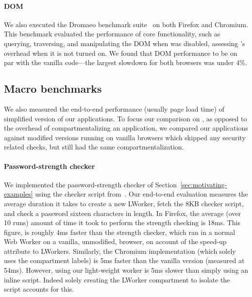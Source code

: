 \paragraph{DOM} We also executed the Dromaeo benchmark suite~\cite{dromaeo} on both
Firefox and Chromium.
%
This benchmark evaluated the performance of core functionality,
such as querying, traversing, and manipulating the DOM when
\sys{} was disabled, assessing \sys{}'s overhead when it is not
turned on.
%
We found that DOM performance to be on par with
the vanilla code---the largest slowdown for both browsers was under
4\%.

\subsection{Macro benchmarks}
\label{sec:eval:macro}

We also measured the end-to-end performance (usually page load time) of
simplified version of our applications.
%
To focus our comparison on \sys{}, as opposed to the overhead of
compartmentalizing an application, we compared our applications
against modified versions running on vanilla browsers which skipped any security
related checks, but still had the same compartmentalization.
%

\paragraph{Password-strength checker}
%
We implemented the password-strength checker of
Section~\ref{sec:motivating-examples} using the checker script
from~\cite{checker1}.
%
Our end-to-end evaluation measures the average duration it takes to
create a new LWorker, fetch the 8KB checker script, and check a password
sixteen characters in length.
%
In Firefox, the average (over 10 runs) amount of time it took to
perform the strength checking is 18ms.
%
This figure, is roughly 4ms faster than the strength checker,
which ran in a normal Web Worker on a vanilla, unmodified, browser,
on account of the speed-up attribute to LWorkers.
%
Similarly, the Chromium implementation (which solely uses the
compartment labels) is 5ms faster than the vanilla version (measured
at 54ms).
%
However, using our light-weight worker is 5ms slower than simply
using an inline script.
Indeed solely creating the LWorker compartment to isolate the script
accounts for this.


